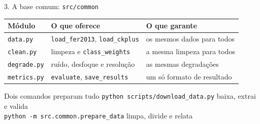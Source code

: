 \documentclass[aspectratio=169,t,xcolor=table]{beamer}
\newcommand{\code}[1]{\texttt{#1}}
\begin{document}
\begin{frame}{3. A base comum: \code{src/common}}

    \begin{table}[]
        \centering
        \footnotesize
        \renewcommand{\arraystretch}{1.3}
        \setlength{\tabcolsep}{7pt}
        {
            \begin{tabular}{>{\raggedright\arraybackslash}p{1.8cm}>{\raggedright\arraybackslash}p{4.5cm}>{\raggedright\arraybackslash}p{4.3cm}}
                \toprule
                \textbf{Módulo}    & \textbf{O que oferece}                          & \textbf{O que garante}               \\
                \midrule
                \code{data.py}     & \code{load\_fer2013}, \code{load\_ckplus}       & os mesmos dados para todos            \\
                \code{clean.py}    & limpeza e \code{class\_weights}                 & a mesma limpeza para todos            \\
                \code{degrade.py}  & ruído, desfoque e resolução                     & as mesmas degradações                 \\
                \code{metrics.py}  & \code{evaluate}, \code{save\_results}           & um só formato de resultado            \\
                \bottomrule
            \end{tabular}
        }
    \end{table}

    \begin{block}{Dois comandos preparam tudo}
        \code{python scripts/download\_data.py} \hfill baixa, extrai e valida\\
        \code{python -m src.common.prepare\_data} \hfill limpa, divide e relata
    \end{block}\par
    \vspace{\fill}

\end{frame}
\end{document}

